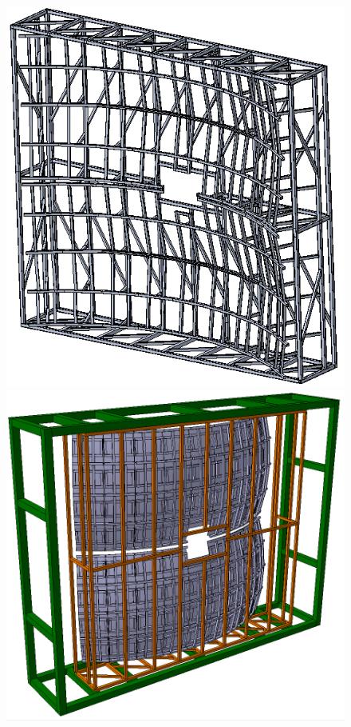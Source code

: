 
\begin{figure}[H]
\begin{minipage}[b]{0.49\textwidth}
\includegraphics[width=1.0\textwidth]{pictures/Frame_small_CAD.png}
\end{minipage}
\hspace{0.01\textwidth}
\begin{minipage}[b]{0.49\textwidth}
\includegraphics[width=1.0\textwidth]{pictures/Frame_small_MC2.png}

\end{minipage}
\end{figure}
